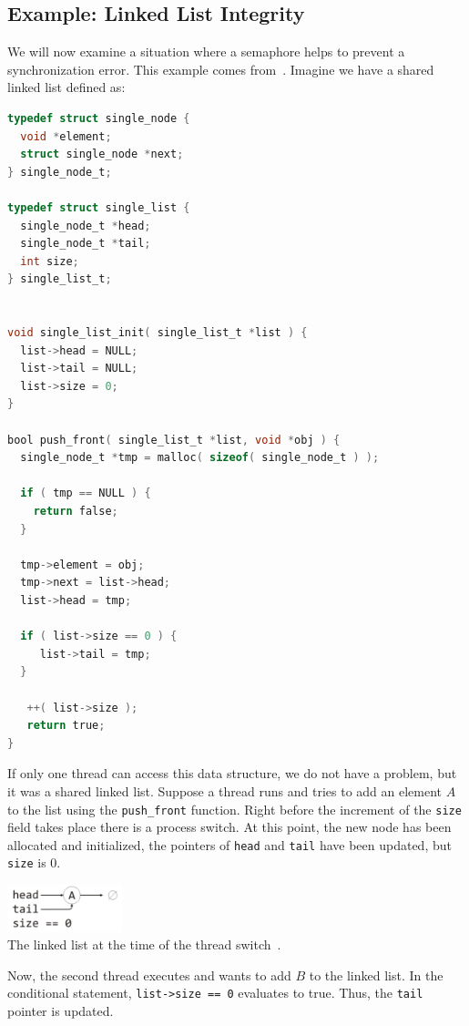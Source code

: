 \documentclass[a4paper]{report}
\begin{document}
\subsection*{Example: Linked List Integrity}
We will now examine a situation where a semaphore helps to prevent a synchronization error. This example comes from~\cite{mte241}. Imagine we have a shared linked list defined as:

\begin{lstlisting}[language=C]
typedef struct single_node {
  void *element;
  struct single_node *next;
} single_node_t;

typedef struct single_list {
  single_node_t *head;
  single_node_t *tail;
  int size;
} single_list_t;


void single_list_init( single_list_t *list ) {
  list->head = NULL;
  list->tail = NULL;
  list->size = 0;
}

bool push_front( single_list_t *list, void *obj ) {
  single_node_t *tmp = malloc( sizeof( single_node_t ) );
  
  if ( tmp == NULL ) {
    return false;
  }
  
  tmp->element = obj;
  tmp->next = list->head;
  list->head = tmp;

  if ( list->size == 0 ) {
     list->tail = tmp;
  }
  
   ++( list->size );
   return true;
}
\end{lstlisting}

If only one thread can access this data structure, we do not have a problem, but it was a shared linked list. Suppose a thread runs and tries to add an element $A$ to the list using the \texttt{push\_front} function. Right before the increment of the \texttt{size} field takes place there is a process switch. At this point, the new node has been allocated and initialized, the pointers of \texttt{head} and \texttt{tail} have been updated, but \texttt{size} is 0.

\begin{center}
	\includegraphics[width=0.25\textwidth]{images/linkedlist1.png}\\
	The linked list at the time of the thread switch~\cite{mte241}.
\end{center}

Now, the second thread executes and wants to add $B$ to the linked list. In the conditional statement, \texttt{list->size == 0} evaluates to true. Thus, the \texttt{tail} pointer is updated.
\end{document}
